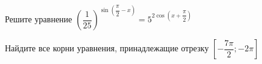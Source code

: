 \begin{ex}
	\begin{condition}
		\begin{enumcols}[label=\asbuk*)]
			\item Решите уравнение \( \left(\dfrac{1}{25}\right)^{\sin{\left( \dfrac{\pi}{2} - x\right)}} = 5^{2\cos {\left(x + \dfrac{\pi}{2}\right)}} \)
			\item Найдите все корни уравнения, принадлежащие отрезку \( \left[-\dfrac{7\pi}{2};-2\pi\right] \)
		\end{enumcols}
	\end{condition}
\end{ex}
